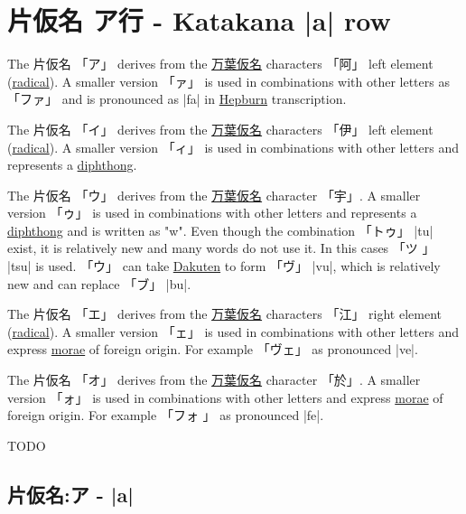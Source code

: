 \section{片仮名 ア行 - Katakana |a| row}


The 片仮名 {「ア」} derives from the
\hyperref[sec:Manyogana]{万葉仮名} characters {「阿」} left element
(\hyperref[sec:Radical]{radical}).  A smaller version {「ァ」} is used in
combinations with other letters as {「ファ」} and is pronounced as |fa| in
\hyperref[sec:Hepburn]{Hepburn} transcription.

The 片仮名 {「イ」} derives from the
\hyperref[sec:Manyogana]{万葉仮名} characters {「伊」} left element
(\hyperref[sec:Radical]{radical}).  A smaller version {「ィ」} is used in
combinations with other letters and represents a
\hyperref[sec:Diphthong]{diphthong}. 

The 片仮名 {「ウ」} derives from the
\hyperref[sec:Manyogana]{万葉仮名} character {「宇」}. A smaller version
{「ゥ」} is used in combinations with other letters and represents a
\hyperref[sec:Diphthong]{diphthong} and is written as "w". Even though the
combination {「トゥ」} |tu| exist, it is relatively new and many words do not
use it. In this cases {「ツ 」} |tsu| is used. {「ウ」} can take
\hyperref[sec:Dakuten]{Dakuten} to form {「ヴ」} |vu|, which is relatively new
and can replace {「ブ」} |bu|. 

The 片仮名 {「エ」} derives from the
\hyperref[sec:Manyogana]{万葉仮名} characters {「江」} right element
(\hyperref[sec:Radical]{radical}). A smaller version {「ェ」} is used in
combinations with other letters and express \hyperref[sec:Mora]{morae} of
foreign origin. For example {「ヴェ」} as pronounced |ve|.

The 片仮名 {「オ」} derives from the
\hyperref[sec:Manyogana]{万葉仮名} character {「於」}. A smaller version
{「ォ」} is used in combinations with other letters and express
\hyperref[sec:Mora]{morae} of foreign origin. For example {「フォ 」} as
pronounced |fe|.

\newpage
TODO
\newpage


\subsection{片仮名:ア - |a|} \label{sec:KatakanaA}

